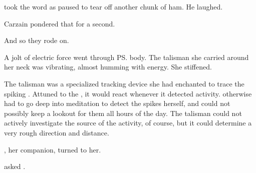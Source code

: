 \begin{garbage}
\Delph{} took the word as \Tsekkect{} paused to tear off another chunk of ham. 
He laughed.

Carzain pondered that for a second. 


And so they rode on. 







\begin{comment}
\section{\Esmerel}
\end{comment}
\new
{}

A jolt of electric force went through \Chyrie{} \ps{\Esmerel} body. 
The talisman she carried around her neck was vibrating, almost humming with energy. 
She stiffened. 


The talisman was a specialized tracking device she had enchanted to trace the spiking \vertex. 
Attuned to the \vertex, it would react whenever it detected activity. 
\Esmerel{} otherwise had to go deep into meditation to detect the spikes herself, and could not possibly keep a lookout for them all hours of the day.
The talisman could not actively investigate the source of the \vertex{} activity, of course, but it could determine a very rough direction and distance. 

\Isacc{} \Chiran, her \gandierre{} companion, turned to her. 


 asked \Chiran. 

 
\end{garbage}










